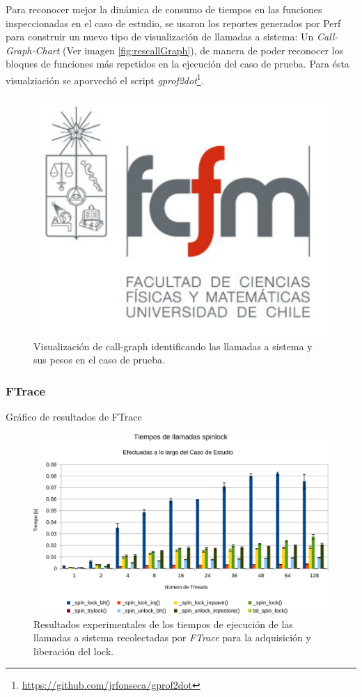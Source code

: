 Para reconocer mejor la dinámica de consumo de tiempos en las funciones inspeccionadas en el caso de estudio, se usaron los reportes generados por Perf para construir un nuevo tipo de visualización de llamadas a sistema: Un \emph{Call-Graph-Chart} (Ver imagen \ref{fig:rescallGraph}), de manera de poder reconocer los bloques de funciones más repetidos en la ejecución del caso de prueba. Para ésta visualziación se aporvechó el script \emph{gprof2dot}\footnote{\url{https://github.com/jrfonseca/gprof2dot}}.
\begin{figure}[!h]
	\centering
	\includegraphics[scale=.5]{imagenes/fcfm}
	\caption{Visualización de call-graph identificando las llamadas a sistema y sus pesos en el caso de prueba.}
	\label{fig:detalleFtrace}
\end{figure}

\subsubsection{FTrace}
Gráfico de resultados de FTrace
\begin{figure}[!h]
	\centering
	\includegraphics[scale=.5]{resultados/detalleFtrace-crop.pdf}
	\caption{Resultados experimentales de los tiempos de ejecución de las llamadas a sistema recolectadas por \emph{FTrace} para la adquisición y liberación del lock.}
	\label{fig:}
\end{figure}


